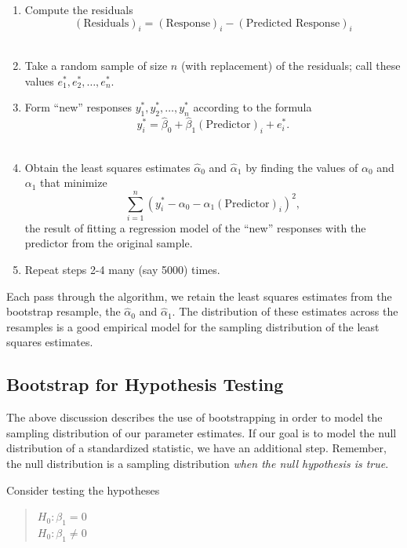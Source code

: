 \documentclass[
  letterpaper,
  DIV=11,
  numbers=noendperiod]{scrreprt}
\providecommand{\tightlist}{%
  \setlength{\itemsep}{0pt}\setlength{\parskip}{0pt}}\usepackage{longtable,booktabs,array}
\theoremstyle{definition}
\theoremstyle{definition}
\theoremstyle{plain}
\theoremstyle{remark}
\begin{document}
\begin{enumerate}
\def\labelenumi{\arabic{enumi}.}
\tightlist
\item
  Compute the residuals
  \[(\text{Residuals})_i = (\text{Response})_i - (\text{Predicted Response})_i\]\\
\item
  Take a random sample of size \(n\) (with replacement) of the
  residuals; call these values \(e_1^*, e_2^*,  \dotsc, e_n^*\).\\
\item
  Form ``new'' responses \(y_1^*, y_2^*, \dotsc, y_n^*\) according to
  the formula
  \[y_i^* = \widehat{\beta}_0 + \widehat{\beta}_1 (\text{Predictor})_i + e_i^*.\]\\
\item
  Obtain the least squares estimates \(\widehat{\alpha}_0\) and
  \(\widehat{\alpha}_1\) by finding the values of \(\alpha_0\) and
  \(\alpha_1\) that minimize
  \[\sum_{i=1}^{n} \left(y_i^* - \alpha_0 - \alpha_1 (\text{Predictor})_i\right)^2,\]
  the result of fitting a regression model of the ``new'' responses with
  the predictor from the original sample.\\
\item
  Repeat steps 2-4 many (say 5000) times.
\end{enumerate}

Each pass through the algorithm, we retain the least squares estimates
from the bootstrap resample, the \(\widehat{\alpha}_0\) and
\(\widehat{\alpha}_1\). The distribution of these estimates across the
resamples is a good empirical model for the sampling distribution of the
least squares estimates.

\subsection{Bootstrap for Hypothesis
Testing}\label{bootstrap-for-hypothesis-testing}

The above discussion describes the use of bootstrapping in order to
model the sampling distribution of our parameter estimates. If our goal
is to model the null distribution of a standardized statistic, we have
an additional step. Remember, the null distribution is a sampling
distribution \emph{when the null hypothesis is true}.

Consider testing the hypotheses

\begin{quote}
\(H_0: \beta_1 = 0\)\\
\(H_0: \beta_1 \neq 0\)
\end{quote}
\end{document}
